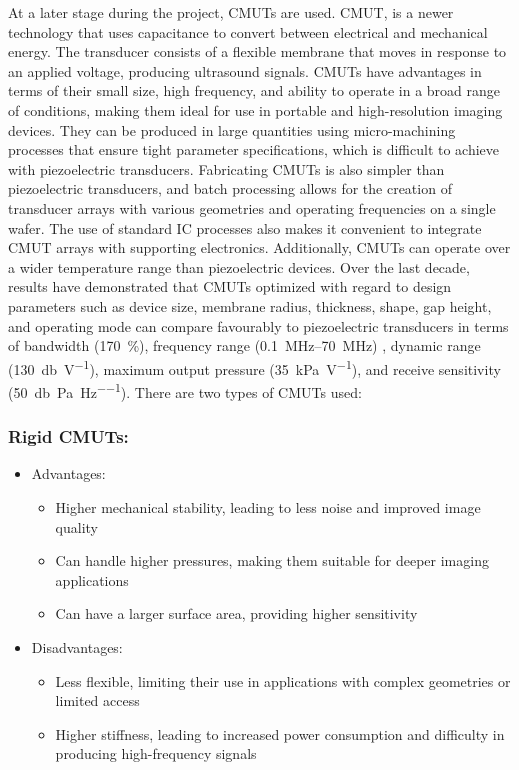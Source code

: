 At a later stage during the project, CMUTs are used. CMUT, is a newer technology that uses capacitance to convert between electrical and mechanical energy. The transducer consists of a flexible membrane that moves in response to an applied voltage, producing ultrasound signals. CMUTs have advantages in terms of their small size, high frequency, and ability to operate in a broad range of conditions, making them ideal for use in portable and high-resolution imaging devices. They can be produced in large quantities using micro-machining processes that ensure tight parameter specifications, which is difficult to achieve with piezoelectric transducers. Fabricating CMUTs is also simpler than piezoelectric transducers, and batch processing allows for the creation of transducer arrays with various geometries and operating frequencies on a single wafer. The use of standard IC processes also makes it convenient to integrate CMUT arrays with supporting electronics. Additionally, CMUTs can operate over a wider temperature range than piezoelectric devices. Over the last decade, results have demonstrated that CMUTs optimized with regard to design parameters such as device size, membrane radius, thickness, shape, gap height, and operating mode can compare favourably to piezoelectric transducers in terms of bandwidth (\qty{170}{\percent}), frequency range (\qtyrange[scientific-notation = engineering]{0.1}{70}{\mega\hertz}) , dynamic range (\qty{130}{\decibel\per\volt}), maximum output pressure (\qty{35}{\kilo\pascal\per\volt}), and receive sensitivity (\qty{50}{\decibel\per\pascal\per\hertz}). There are two types of CMUTs used:

\subsubsection{Rigid CMUTs:}
\begin{itemize}
	\item Advantages:
	\begin{itemize}
		\item Higher mechanical stability, leading to less noise and improved image quality
		\item Can handle higher pressures, making them suitable for deeper imaging applications
		\item Can have a larger surface area, providing higher sensitivity
	\end{itemize}
	\item Disadvantages:
	\begin{itemize}
		\item Less flexible, limiting their use in applications with complex geometries or limited access
		\item Higher stiffness, leading to increased power consumption and difficulty in producing high-frequency signals
	\end{itemize}
\end{itemize}
